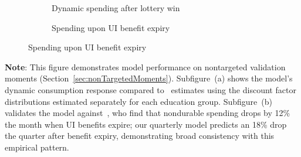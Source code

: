 \documentclass[\latexroot/\projectname]{subfiles}
\begin{document}
\begin{figure}[H]
  \centering
  \caption{\pregenmark Model validation for nontargeted spending patterns}
  \whenintegrated{\label{fig:untargetedMoments}} %
  \noindent\begin{minipage}{\textwidth}
    \centering
    \begin{subfigure}[b]{.48\linewidth}
      \centering
      \caption{Dynamic spending after lottery win}
      \whenintegrated{\label{fig:USaggmpclotterywin}} %
    \end{subfigure}
    \begin{subfigure}[b]{.48\linewidth}
      \centering
      \caption{Spending upon UI benefit expiry}
      \whenintegrated{\label{fig:expiryUI}} %
    \end{subfigure}
  \end{minipage}
\end{figure}
\noindent\parbox{\textwidth}{\footnotesize
  \textbf{Note}: This figure demonstrates model performance on nontargeted validation moments (Section~\ref{sec:nonTargetedMoments}).
  Subfigure~(a) shows the model's dynamic consumption response compared to~\cite{fagereng-mpc-2021} estimates
  using the discount factor distributions estimated separately for each education group.
  Subfigure~(b) validates the model against~\cite{ganongConsumer2019}, who find that nondurable spending
  drops by 12\% the month when UI benefits expire; our quarterly model predicts an 18\% drop
  the quarter after benefit expiry,   demonstrating broad consistency with this empirical pattern.
}

\vspace{1em}  %

\smartbib
\end{document}
